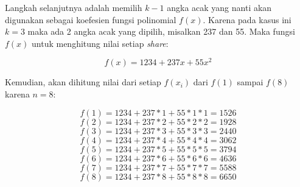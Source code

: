 Langkah selanjutnya adalah memilih \begin{math}k-1\end{math} angka acak yang nanti akan digunakan sebagai koefesien fungsi polinomial \begin{math}f(x)\end{math}. Karena pada kasus ini \begin{math}k=3\end{math} maka ada 2 angka acak yang dipilih, misalkan 237 dan 55. Maka fungsi \begin{math}f(x)\end{math} untuk menghitung nilai setiap \textit{share}:

\begin{displaymath}
	f(x) = 1234 + 237x + 55x^2
\end{displaymath}

Kemudian, akan dihitung nilai dari setiap \begin{math}f(x_i)\end{math} dari \begin{math}f(1)\end{math} sampai \begin{math}f(8)\end{math} karena \begin{math}n=8\end{math}:

\begin{equation}
	f(1) = 1234 + 237*1 + 55*1*1 = 1526
\end{equation}
\begin{displaymath}
	f(2) = 1234 + 237*2 + 55*2*2 = 1928
\end{displaymath}
\begin{displaymath}
	f(3) = 1234 + 237*3 + 55*3*3 = 2440
\end{displaymath}
\begin{displaymath}
	f(4) = 1234 + 237*4 + 55*4*4 = 3062
\end{displaymath}
\begin{displaymath}
	f(5) = 1234 + 237*5 + 55*5*5 = 3794
\end{displaymath}
\begin{displaymath}
	f(6) = 1234 + 237*6 + 55*6*6 = 4636
\end{displaymath}
\begin{displaymath}
	f(7) = 1234 + 237*7 + 55*7*7 = 5588
\end{displaymath}
\begin{displaymath}
	f(8) = 1234 + 237*8 + 55*8*8 = 6650
\end{displaymath}

